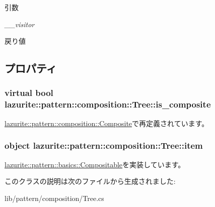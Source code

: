 \begin{DoxyParams}{引数}
\item[{\em \_\-\_\-visitor}]\end{DoxyParams}
\begin{DoxyReturn}{戻り値}

\end{DoxyReturn}


\subsection{プロパティ}
\hypertarget{classlazurite_1_1pattern_1_1composition_1_1_tree_a292230ac66f50163b23b306d698ad511}{
\subsubsection[{is\_\-composite}]{\setlength{\rightskip}{0pt plus 5cm}virtual bool lazurite::pattern::composition::Tree::is\_\-composite}}
\label{classlazurite_1_1pattern_1_1composition_1_1_tree_a292230ac66f50163b23b306d698ad511}


\hyperlink{classlazurite_1_1pattern_1_1composition_1_1_composite_a38ec1a6e088e9831d4e3045d0741f7cb}{lazurite::pattern::composition::Composite}で再定義されています。\hypertarget{classlazurite_1_1pattern_1_1composition_1_1_tree_a2c78ae8ec2f8cb02c6971548c3c1be16}{
\subsubsection[{item}]{\setlength{\rightskip}{0pt plus 5cm}object lazurite::pattern::composition::Tree::item}}
\label{classlazurite_1_1pattern_1_1composition_1_1_tree_a2c78ae8ec2f8cb02c6971548c3c1be16}


\hyperlink{interfacelazurite_1_1pattern_1_1basics_1_1_compositable_a5c6c16d4fcce4b6c5272842c529bf536}{lazurite::pattern::basics::Compositable}を実装しています。

このクラスの説明は次のファイルから生成されました:\begin{DoxyCompactItemize}
\item 
lib/pattern/composition/Tree.cs\end{DoxyCompactItemize}
